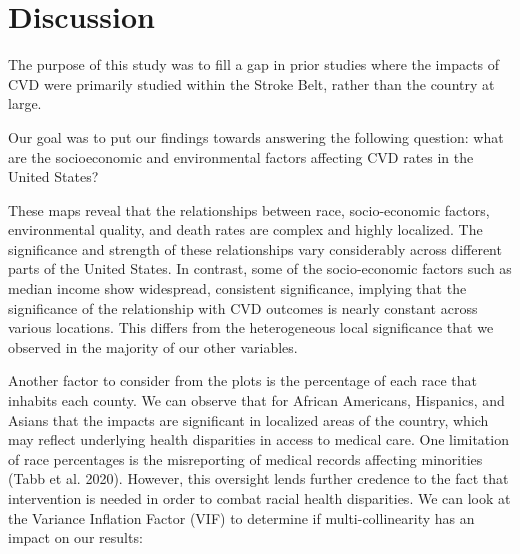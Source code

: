\documentclass[
]{article}
\begin{document}
\section{Discussion}\label{discussion}

The purpose of this study was to fill a gap in prior studies where the
impacts of CVD were primarily studied within the Stroke Belt, rather
than the country at large.

Our goal was to put our findings towards answering the following
question: what are the socioeconomic and environmental factors affecting
CVD rates in the United States?

These maps reveal that the relationships between race, socio-economic
factors, environmental quality, and death rates are complex and highly
localized. The significance and strength of these relationships vary
considerably across different parts of the United States. In contrast,
some of the socio-economic factors such as median income show
widespread, consistent significance, implying that the significance of
the relationship with CVD outcomes is nearly constant across various
locations. This differs from the heterogeneous local significance that
we observed in the majority of our other variables.

Another factor to consider from the plots is the percentage of each race
that inhabits each county. We can observe that for African Americans,
Hispanics, and Asians that the impacts are significant in localized
areas of the country, which may reflect underlying health disparities in
access to medical care. One limitation of race percentages is the
misreporting of medical records affecting minorities (Tabb et al. 2020).
However, this oversight lends further credence to the fact that
intervention is needed in order to combat racial health disparities. We
can look at the Variance Inflation Factor (VIF) to determine if
multi-collinearity has an impact on our results:

\begin{table}

\caption{\label{tbl-10}}


\end{table}%
\end{document}
